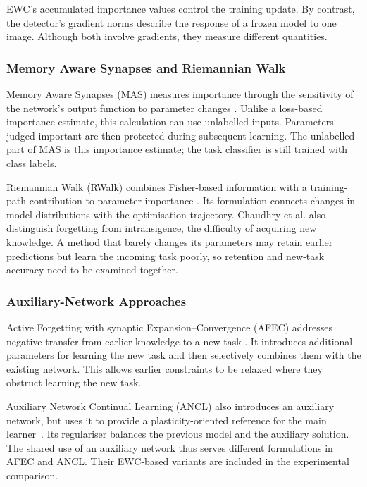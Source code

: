 EWC's accumulated importance values control the training update. By
contrast, the detector's gradient norms describe the response of a frozen
model to one image. Although both involve gradients, they measure different
quantities.

\subsubsection{Memory Aware Synapses and Riemannian Walk}

Memory Aware Synapses (MAS) measures importance through the sensitivity of
the network's output function to parameter changes
\cite{aljundi2018mas}. Unlike a loss-based importance estimate, this
calculation can use unlabelled inputs. Parameters judged important are then
protected during subsequent learning. The unlabelled part of MAS is this
importance estimate; the task classifier is still trained with class labels.

Riemannian Walk (RWalk) combines Fisher-based information with a
training-path contribution to parameter importance
\cite{chaudhry2018rwalk}. Its formulation connects changes in model
distributions with the optimisation trajectory. Chaudhry et al. also
distinguish forgetting from intransigence, the difficulty of acquiring new
knowledge. A method that barely changes its parameters may retain earlier
predictions but learn the incoming task poorly, so retention and new-task
accuracy need to be examined together.

\subsubsection{Auxiliary-Network Approaches}

Active Forgetting with synaptic Expansion--Convergence (AFEC) addresses
negative transfer from earlier knowledge to a new task
\cite{wang2021afec}. It introduces additional parameters for learning the
new task and then selectively combines them with the existing network.
This allows earlier constraints to be relaxed where they obstruct learning
the new task.

Auxiliary Network Continual Learning (ANCL) also introduces an auxiliary
network, but uses it to provide a plasticity-oriented reference for the main
learner~\cite{kim2023ancl}. Its regulariser balances the previous model and
the auxiliary solution. The shared use of an auxiliary network thus serves
different formulations in AFEC and ANCL. Their EWC-based variants are
included in the experimental comparison.

